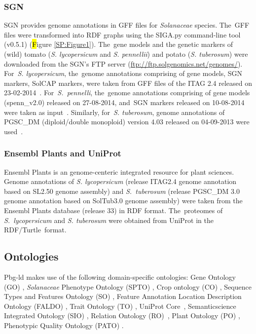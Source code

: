 \documentclass[applsci,article,accept,moreauthors,pdftex]{Definitions/mdpi}
\begin{document}
{\subsubsection{SGN }
SGN provides genome annotations in GFF files for \textit{Solanaceae} %
species. The~GFF files were transformed into RDF graphs using the SIGA.py command-line tool (v0.5.1) \cite{Kuzniar2017} (\hl Figure \ref{SP:Figure1}). %
 The~gene models and the genetic markers of (wild) tomato (\textit{S. lycopersicum} and \textit{S. pennellii}) and potato (\textit{S. tuberosum}) were downloaded from the SGN’s FTP server (\url{ftp://ftp.solgenomics.net/genomes/}). For~\textit{S. lycopersicum}, the~genome annotations comprising of gene models, SGN markers, SolCAP markers, were taken from GFF files of the ITAG 2.4 released on 23-02-2014~\cite{LyocITAG2.4}. For~\textit{S.~pennelli}, the~genome annotations comprising of gene models (spenn{\_}v2.0) released on 27-08-2014, and~SGN markers released on 10-08-2014 were taken as input~\cite{PennITAG2.4}. Similarly, for~\textit{S. tuberosum}, genome annotations of PGSC{\_}DM (diploid/double monoploid) version 4.03 released on 04-09-2013 were used~\cite{PGSCDM}.

\subsubsection{Ensembl Plants and UniProt}
Ensembl Plants is an genome-centeric integrated resource for plant sciences. Genome annotations of \textit{S. lycopersicum} (release ITAG2.4 genome annotation based on SL2.50 genome assembly) \cite{EnsemblPlantSolanumlycopersicum} and \textit{S.~tuberosum} (release PGSC{\_}DM 3.0 genome annotation  based on SolTub3.0  genome assembly) were taken from the Ensembl Plants database (release 33) \cite{EnsemblPlantSolanumtuberosum} in RDF format. The~proteomes of \textit{S.~lycopersicum} \cite{UniprotSL} and \textit{S. tuberosum} \cite{UniprotST} were obtained from UniProt in the RDF/Turtle~format. 

\subsection{Ontologies}
Pbg-ld makes use of the following domain-specific ontologies: Gene Ontology (GO) \cite{GOontology}, \textit{Solanaceae} %
Phenotype Ontology (SPTO) \cite{SPTO}, Crop ontology (CO) \cite{CO}, Sequence Types and Features Ontology (SO) \cite{Eilbeck2005}, Feature Annotation Location Description Ontology (FALDO) \cite{FALDO}, Trait Ontology (TO) \cite{TO}, UniProt Core~\cite{UniprotRDFcore}, Semanticscience Integrated Ontology (SIO) \cite{SIO}, Relation Ontology (RO)~\cite{RO}, Plant Ontology (PO) \cite{doi:10.1093/pcp/pcs163}, Phenotypic Quality Ontology (PATO) \cite{Walls2012}.
\\\\


}
\end{document}
